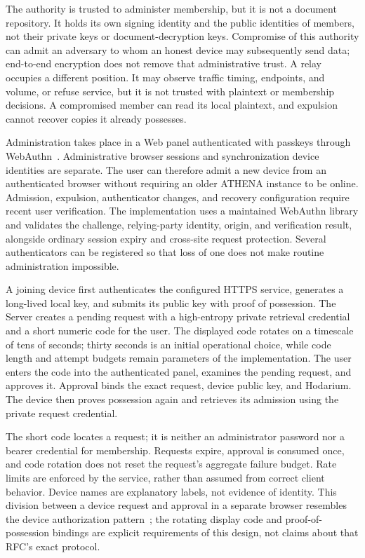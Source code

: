 \documentclass[11pt,a4paper]{article}
\theoremstyle{definition}
\theoremstyle{plain}
\begin{document}
The authority is trusted to administer membership, but it is not a
document repository. It holds its own signing identity and the public
identities of members, not their private keys or document-decryption
keys. Compromise of this authority can admit an adversary to whom an
honest device may subsequently send data; end-to-end encryption does
not remove that administrative trust. A relay occupies a different
position. It may observe traffic timing, endpoints, and volume, or
refuse service, but it is not trusted with plaintext or membership
decisions. A compromised member can read its local plaintext, and
expulsion cannot recover copies it already possesses.

Administration takes place in a Web panel authenticated with passkeys
through WebAuthn~\cite{webauthn}. Administrative browser sessions and
synchronization device identities are separate. The user can therefore
admit a new device from an authenticated browser without requiring an
older ATHENA instance to be online. Admission, expulsion, authenticator
changes, and recovery configuration require recent user verification.
The implementation uses a maintained WebAuthn library and validates
the challenge, relying-party identity, origin, and verification result,
alongside ordinary session expiry and cross-site request protection.
Several authenticators can be registered so that loss of one does not
make routine administration impossible.

A joining device first authenticates the configured HTTPS service,
generates a long-lived local key, and submits its public key with proof
of possession. The Server creates a pending request with a high-entropy
private retrieval credential and a short numeric code for the user.
The displayed code rotates on a timescale of tens of seconds; thirty
seconds is an initial operational choice, while code length and attempt
budgets remain parameters of the implementation. The user enters the
code into the authenticated panel, examines the pending request, and
approves it. Approval binds the exact request, device public key, and
Hodarium. The device then proves possession again and retrieves its
admission using the private request credential.

The short code locates a request; it is neither an administrator
password nor a bearer credential for membership. Requests expire,
approval is consumed once, and code rotation does not reset the
request's aggregate failure budget. Rate limits are enforced by the
service, rather than assumed from correct client behavior. Device
names are explanatory labels, not evidence of identity. This division
between a device request and approval in a separate browser resembles
the device authorization pattern~\cite{deviceflow}; the rotating display
code and proof-of-possession bindings are explicit requirements of
this design, not claims about that RFC's exact protocol.
\end{document}
